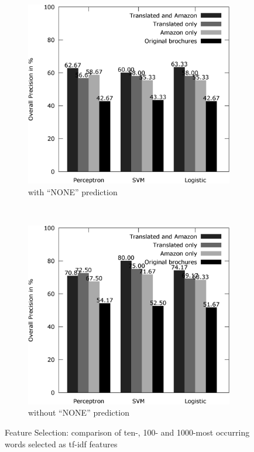 \begin{figure}[h!]
	\centering
	\begin{subfigure}[t]{0.5\textwidth}
		\includegraphics[width=\textwidth]{figures/product_translate_amazon_with_none.eps}
		\caption{with ``NONE'' prediction}
	\end{subfigure}~
	\begin{subfigure}[t]{0.5\textwidth}
		\includegraphics[width=\textwidth]{figures/product_translate_amazon_without_none.eps}
		\caption{without ``NONE'' prediction}
	\end{subfigure}
	\caption{Feature Selection: comparison of ten-, 100- and 1000-most occurring words selected as tf-idf features}
	\label{fig:product_translate_amazon}
\end{figure}

